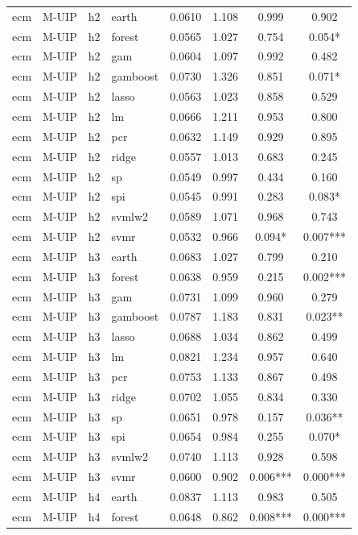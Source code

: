 \begin{ThreePartTable}
\begin{longtable}[t]{llclcccc}
\addlinespace
ecm & M-UIP & h2 & earth & 0.0610 & 1.108 & 0.999 & 0.902\\
ecm & M-UIP & h2 & forest & 0.0565 & 1.027 & 0.754 & 0.054*\\
ecm & M-UIP & h2 & gam & 0.0604 & 1.097 & 0.992 & 0.482\\
ecm & M-UIP & h2 & gamboost & 0.0730 & 1.326 & 0.851 & 0.071*\\
ecm & M-UIP & h2 & lasso & 0.0563 & 1.023 & 0.858 & 0.529\\
ecm & M-UIP & h2 & lm & 0.0666 & 1.211 & 0.953 & 0.800\\
ecm & M-UIP & h2 & pcr & 0.0632 & 1.149 & 0.929 & 0.895\\
ecm & M-UIP & h2 & ridge & 0.0557 & 1.013 & 0.683 & 0.245\\
ecm & M-UIP & h2 & sp & 0.0549 & 0.997 & 0.434 & 0.160\\
ecm & M-UIP & h2 & spi & 0.0545 & 0.991 & 0.283 & 0.083*\\
ecm & M-UIP & h2 & svmlw2 & 0.0589 & 1.071 & 0.968 & 0.743\\
ecm & M-UIP & h2 & svmr & 0.0532 & 0.966 & 0.094* & 0.007***\\
\addlinespace
ecm & M-UIP & h3 & earth & 0.0683 & 1.027 & 0.799 & 0.210\\
ecm & M-UIP & h3 & forest & 0.0638 & 0.959 & 0.215 & 0.002***\\
ecm & M-UIP & h3 & gam & 0.0731 & 1.099 & 0.960 & 0.279\\
ecm & M-UIP & h3 & gamboost & 0.0787 & 1.183 & 0.831 & 0.023**\\
ecm & M-UIP & h3 & lasso & 0.0688 & 1.034 & 0.862 & 0.499\\
ecm & M-UIP & h3 & lm & 0.0821 & 1.234 & 0.957 & 0.640\\
ecm & M-UIP & h3 & pcr & 0.0753 & 1.133 & 0.867 & 0.498\\
ecm & M-UIP & h3 & ridge & 0.0702 & 1.055 & 0.834 & 0.330\\
ecm & M-UIP & h3 & sp & 0.0651 & 0.978 & 0.157 & 0.036**\\
ecm & M-UIP & h3 & spi & 0.0654 & 0.984 & 0.255 & 0.070*\\
ecm & M-UIP & h3 & svmlw2 & 0.0740 & 1.113 & 0.928 & 0.598\\
ecm & M-UIP & h3 & svmr & 0.0600 & 0.902 & 0.006*** & 0.000***\\
\addlinespace
ecm & M-UIP & h4 & earth & 0.0837 & 1.113 & 0.983 & 0.505\\
ecm & M-UIP & h4 & forest & 0.0648 & 0.862 & 0.008*** & 0.000***\\

\end{longtable}
\end{ThreePartTable}
